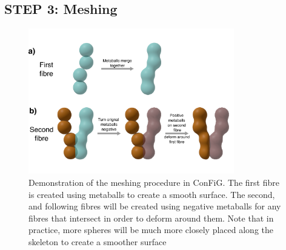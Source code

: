 \subsection{STEP 3: Meshing}
\label{sec:ipmi_step3_meshing}

\begin{figure}
  \centering
  \includegraphics[width=0.8\textwidth]{figures/config/METABALL_fig.png}
  \caption[ConFiG meshing procedure]{Demonstration of the meshing procedure in ConFiG. The first fibre is created using metaballs to create a smooth surface. The second, and following fibres will be created using negative metaballs for any fibres that intersect in order to deform around them. Note that in practice, more spheres will be much more closely placed along the skeleton to create a smoother surface}
  \label{fig:ipmi_meshing}
\end{figure}

